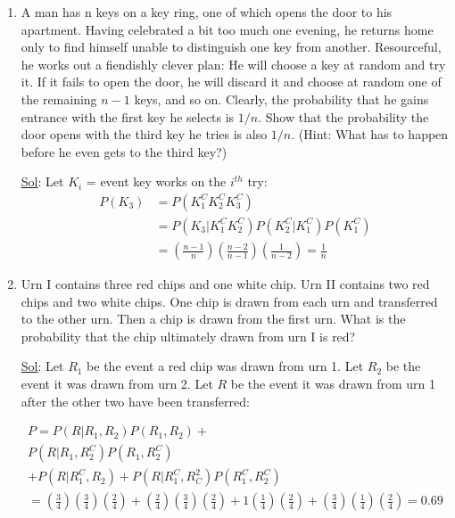 \begin{enumerate}
  \item[22.] A man has n keys on a key ring, one of which opens the
    door to his apartment. Having celebrated a bit too much one
    evening, he returns home only to find himself unable to
    distinguish one key from another. Resourceful, he works out a
    fiendishly clever plan: He will choose a key at random and try
    it. If it fails to open the door, he will discard it and choose
    at random one of the remaining $n-1$ keys, and so on. Clearly,
    the probability that he gains entrance with the first key he
    selects is $1/n$. Show that the probability the door opens with
    the third key he tries is also $1/n$. (Hint: What has to happen
    before he even gets to the third key?)

    \underline{Sol}:
    Let \(K_i\) = event key works on the \(i^{th}\) try:
    \[
      \begin{aligned}
        P(K_3) &= P(K_1^C K_2^C K_3^C) \\
        &= P(K_3 | K_1^C K_2^C) P(K_2^C | K_1^C) P(K_1^C) \\
        &= \boxed{(\frac{n-1}{n})(\frac{n-2}{n-1})(\frac{1}{n-2}) = \frac{1}{n}}
      \end{aligned}
    \]

  \item[30.] Urn I contains three red chips and one white chip. Urn
    II contains two red chips and two white chips. One chip is drawn
    from each urn and transferred to the other urn. Then a chip is
    drawn from the first urn. What is the probability that the chip
    ultimately drawn from urn I is red?

    \underline{Sol}:
    Let \(R_1\) be the event a red chip was drawn from urn 1. Let
    \(R_2\) be the event it was drawn from urn 2. Let \(R\) be the
    event it was drawn from urn 1 after the other two have been transferred:

    \[
      \begin{aligned}
        P = P(R | R_1, R_2) P(R_1, R_2) + \\ P(R | R_1, R_2^C) P(R_1, R_2^C) \\
        + P(R | R_1^C, R_2) + P(R | R_1^C, R^2_C) P(R_1^C, R_2^C) \\
        = (\frac{3}{4})(\frac{3}{4})(\frac{2}{4}) +
        (\frac{2}{4})(\frac{3}{4})(\frac{2}{4}) +
        1(\frac{1}{4})(\frac{2}{4}) +
        (\frac{3}{4})(\frac{1}{4})(\frac{2}{4}) = \boxed{0.69}
      \end{aligned}
    \]


\end{enumerate}
